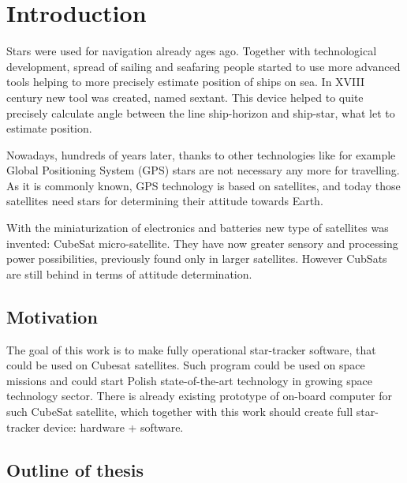 \documentclass[12pt,a4paper,oneside]{article}
\begin{document}
\glsaddall
\setlength{\glsdescwidth}{0.5\linewidth}
\setlength{\glspagelistwidth}{0.1\linewidth}

\printnoidxglossary[type=acronym,sort=letter]
\newpage

\printnoidxglossary[type=symbols,sort=use]

\newpage
\citet{jenssen2011comparison}
\citet{valenti2015keeping}
\citet{delabie2012highly}
\citet{jalabert2011optimization}
\citet{felikson2011orbit}
\citet{knutson2012fast}
\citet{rose2003star}
\citet{mortari2002starnav}


\section{Introduction}
Stars were used for navigation already ages ago. Together with technological development, spread of sailing and seafaring people started to use more advanced tools helping to more precisely estimate position of ships on sea. In XVIII century new tool was created, named sextant. This device helped to quite precisely calculate angle between the line ship-horizon and ship-star, what let to estimate position.

Nowadays, hundreds of years later, thanks to other technologies like for example Global Positioning System (GPS) stars are not necessary any more for travelling. As it is commonly known, GPS technology is based on satellites, and today those satellites need stars for determining their attitude towards Earth.

With the miniaturization of electronics and batteries new type of satellites was invented: CubeSat micro-satellite. They have now greater sensory and processing power possibilities, previously found only in larger satellites. However CubSats are still behind in terms of attitude determination.

\subsection{Motivation}
The goal of this work is to make fully operational star-tracker software, that could be used on Cubesat satellites. Such program could be used on space missions and could start Polish state-of-the-art technology in growing space technology sector.
There is already existing prototype of on-board computer for such CubeSat satellite, which together with this work should create full star-tracker device: hardware + software.

\subsection{Outline of thesis}
\end{document}
